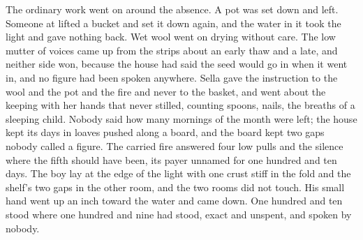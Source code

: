 The ordinary work went on around the absence. A pot was set down and left. Someone at  lifted a bucket and set it down again, and the water in it took the light and gave nothing back. Wet wool went on drying without care. The low mutter of voices came up from the strips about an early thaw and a late, and neither side won, because the house had said the seed would go in when it went in, and no figure had been spoken anywhere. Sella gave the instruction to the wool and the pot and the fire and never to the basket, and went about the keeping with her hands that never stilled, counting spoons, nails, the breaths of a sleeping child. Nobody said how many mornings of the month were left; the house kept its days in loaves pushed along a board, and the board kept two gaps nobody called a figure. The carried fire answered four low pulls and the silence where the fifth should have been, its payer unnamed for one hundred and ten days. The boy lay at the edge of the light with one crust stiff in the fold and the shelf's two gaps in the other room, and the two rooms did not touch. His small hand went up an inch toward the water and came down. One hundred and ten stood where one hundred and nine had stood, exact and unspent, and spoken by nobody.
